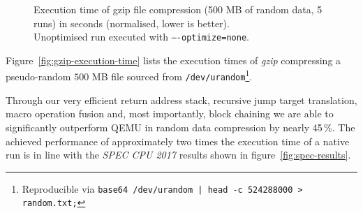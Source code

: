 \begin{figure}[h]
	\centering
	\caption[Execution time of gzip compression]%
	{Execution time of gzip file compression (500 MB of random data, 5 runs) in seconds (normalised, lower is better).\\Unoptimised run executed with \texttt{----optimize=none}.}
	\label{fig:gzip-execution-time}
\end{figure}

Figure~\vref{fig:gzip-execution-time} lists the execution times of \textit{gzip} compressing a pseudo-random $500$ MB file sourced from \texttt{/dev/urandom}\footnote{Reproducible via \texttt{base64 /dev/urandom | head -c 524288000 > random.txt;}}.

Through our very efficient return address stack, recursive jump target translation, macro operation fusion and, most importantly, block chaining we are able to significantly outperform QEMU in random data compression by nearly 45\,\%.
The achieved performance of approximately two times the execution time of a native run is in line with the \textit{SPEC CPU 2017} results shown in figure~\ref{fig:spec-results}.

